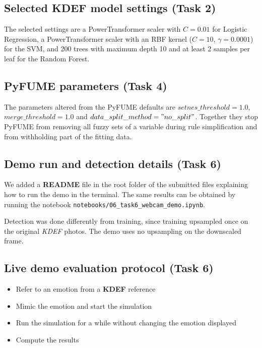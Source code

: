 \FloatBarrier
\subsection{Selected KDEF model settings (Task 2)}
The selected settings are a PowerTransformer scaler with $C = 0.01$ for Logistic Regression, a PowerTransformer scaler with an RBF kernel ($C = 10$, $\gamma = 0.0001$) for the SVM, and 200 trees with maximum depth 10 and at least 2 samples per leaf for the Random Forest.

\FloatBarrier
\subsection{PyFUME parameters (Task 4)}
\label{app:fuzzy-params}
The parameters altered from the PyFUME defaults are $setnes\_threshold=1.0$, $merge\_threshold=1.0$ and $data\_split\_method = "no\_split"$. Together they stop PyFUME from removing all fuzzy sets of a variable during rule simplification and from withholding part of the fitting data.

\FloatBarrier
\subsection{Demo run and detection details (Task 6)}
\label{app:demo-run}
We added a \textbf{README} file in the root folder of the submitted files explaining how to run the demo in the terminal. The same results can be obtained by running the notebook \texttt{notebooks/06\_task6\_webcam\_demo.ipynb}.

Detection was done differently from training, since training upsampled once on the original \textit{KDEF} photos. The demo uses no upsampling on the downscaled frame.

\FloatBarrier
\subsection{Live demo evaluation protocol (Task 6)}
\label{app:demo-protocol}
\begin{itemize}
    \item Refer to an emotion from a \textbf{KDEF} reference
    \item Mimic the emotion and start the simulation
    \item Run the simulation for a while without changing the emotion displayed
    \item Compute the results
\end{itemize}

